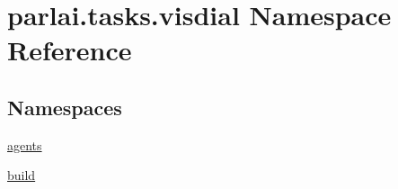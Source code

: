 \hypertarget{namespaceparlai_1_1tasks_1_1visdial}{}\section{parlai.\+tasks.\+visdial Namespace Reference}
\label{namespaceparlai_1_1tasks_1_1visdial}
\subsection*{Namespaces}
\begin{DoxyCompactItemize}
\item 
 \hyperlink{namespaceparlai_1_1tasks_1_1visdial_1_1agents}{agents}
\item 
 \hyperlink{namespaceparlai_1_1tasks_1_1visdial_1_1build}{build}
\end{DoxyCompactItemize}
